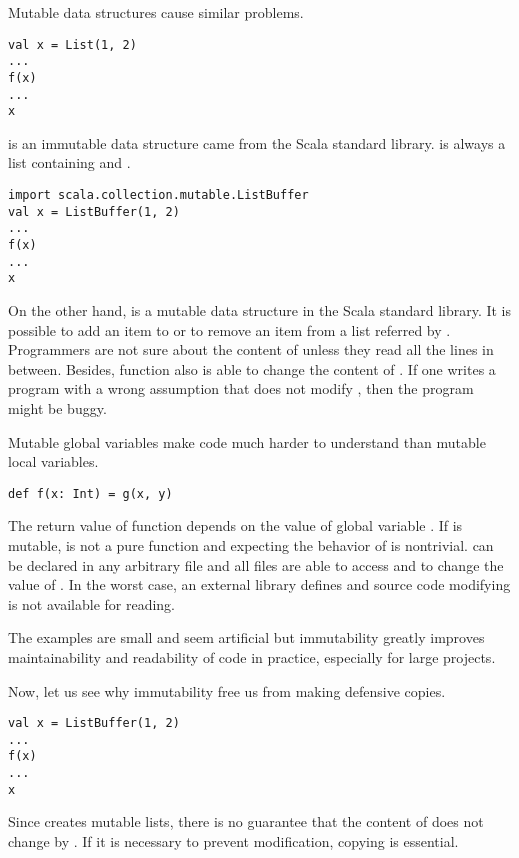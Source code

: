 Mutable data structures cause similar problems.

\begin{verbatim}
val x = List(1, 2)
...
f(x)
...
x
\end{verbatim}

 is an immutable data structure came from the Scala standard library.
 is always a list containing  and .

\begin{verbatim}
import scala.collection.mutable.ListBuffer
val x = ListBuffer(1, 2)
...
f(x)
...
x
\end{verbatim}

On the other hand,  is a mutable data structure in the Scala
standard library. It is possible to add an item to or to remove an item from a
list referred by . Programmers are not sure about the content of 
unless they read all the lines in between. Besides, function  also is
able to change the content of . If one writes a program with a wrong
assumption that  does not modify , then the program might be
buggy.

Mutable global variables make code much harder to understand than mutable local
variables.

\begin{verbatim}
def f(x: Int) = g(x, y)
\end{verbatim}

The return value of function  depends on the value of global variable
. If  is mutable,  is not a pure function and expecting
the behavior of  is nontrivial.  can be declared in any arbitrary
file and all files are able to access  and to change the value of
. In the worst case, an external library defines  and source code
modifying  is not available for reading.

The examples are small and seem artificial but immutability greatly improves
maintainability and readability of code in practice, especially for large
projects.

Now, let us see why immutability free us from making defensive copies.

\begin{verbatim}
val x = ListBuffer(1, 2)
...
f(x)
...
x
\end{verbatim}

Since  creates mutable lists, there is no guarantee that the
content of  does not change by . If it is necessary to prevent
modification, copying  is essential.

